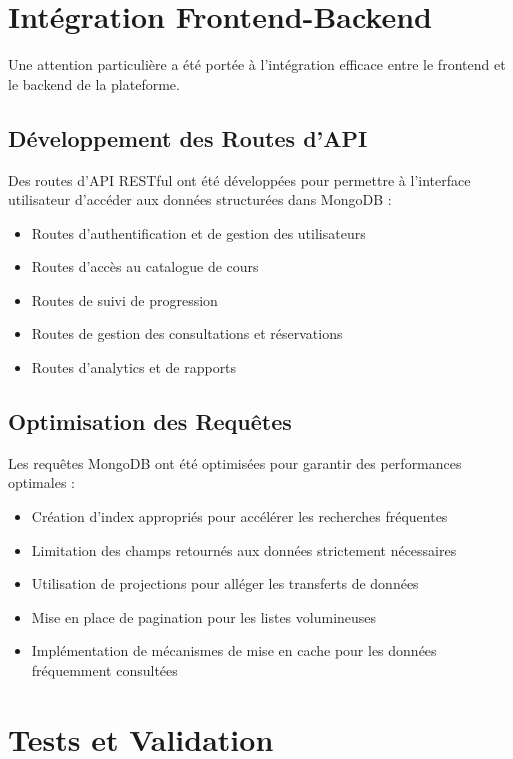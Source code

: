 \section{Intégration Frontend-Backend}

Une attention particulière a été portée à l'intégration efficace entre le frontend et le backend de la plateforme.

\subsection{Développement des Routes d'API}

Des routes d'API RESTful ont été développées pour permettre à l'interface utilisateur d'accéder aux données structurées dans MongoDB :

\begin{itemize}
  \item Routes d'authentification et de gestion des utilisateurs
  \item Routes d'accès au catalogue de cours
  \item Routes de suivi de progression
  \item Routes de gestion des consultations et réservations
  \item Routes d'analytics et de rapports
\end{itemize}

\subsection{Optimisation des Requêtes}

Les requêtes MongoDB ont été optimisées pour garantir des performances optimales :

\begin{itemize}
  \item Création d'index appropriés pour accélérer les recherches fréquentes
  \item Limitation des champs retournés aux données strictement nécessaires
  \item Utilisation de projections pour alléger les transferts de données
  \item Mise en place de pagination pour les listes volumineuses
  \item Implémentation de mécanismes de mise en cache pour les données fréquemment consultées
\end{itemize}

\section{Tests et Validation}

